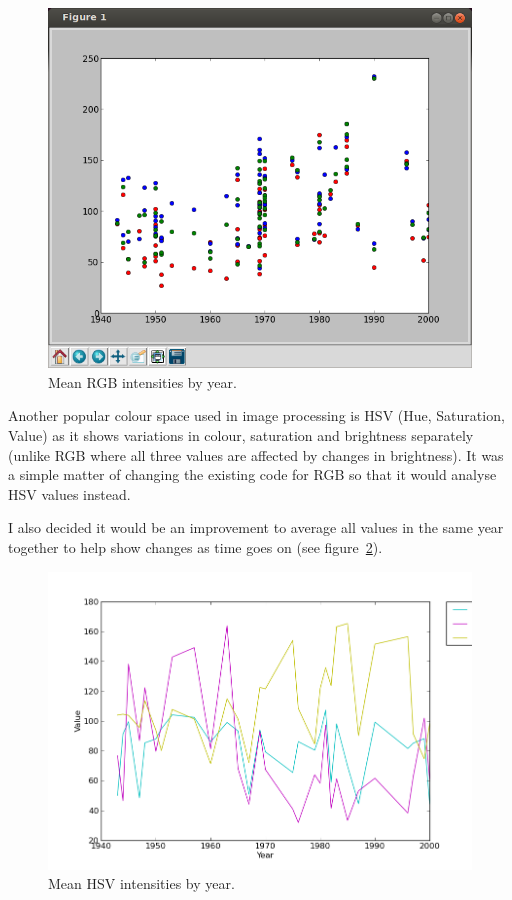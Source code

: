 \documentclass[11pt,fleqn,twoside]{article}
\begin{document}
\begin{figure}[p]
\includegraphics[scale=0.5]{img/kyffin-rgp-avg.png}
\caption{Mean RGB intensities by year.}
\label{fig:mean-rgb-by-year}
\end{figure}

Another popular colour space used in image processing is HSV (Hue, Saturation, Value) as it shows
variations in colour, saturation and brightness separately (unlike RGB where all three values are
affected by changes in brightness). It was a simple matter of changing the existing code for RGB
so that it would analyse HSV values instead.

I also decided it would be an improvement to average all values in the same year together to help
show changes as time goes on (see figure~\ref{fig:mean-hsv-by-year}).

\begin{figure}[p]
\includegraphics[scale=0.5]{img/hsv-legend-12-11-01.png}
\caption{Mean HSV intensities by year.}
\label{fig:mean-hsv-by-year}
\end{figure}
\end{document}
